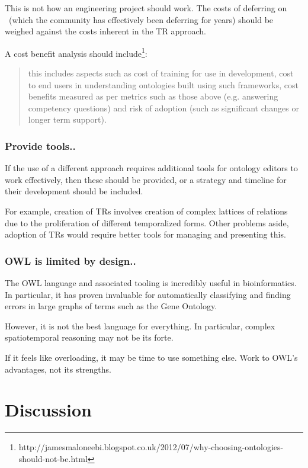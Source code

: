 \documentclass{bioinfo}
\def\P1{\pr{P-1}}
\begin{document}
This is not how an engineering project should work. The costs of
deferring on \P1\ (which the community has effectively been deferring
for years) should be weighed against the costs inherent in the TR
approach.

A cost benefit analysis should include\footnote{http://jamesmaloneebi.blogspot.co.uk/2012/07/why-choosing-ontologies-should-not-be.html}:

\begin{quotation}
this includes aspects such as cost of training for use in development,
cost to end users in understanding ontologies built using such
frameworks, cost benefits measured as per metrics such as those above
(e.g. answering competency questions) and risk of adoption (such as
significant changes or longer term support).
\end{quotation}


\subsubsection{Provide tools..} If the use of a different approach
requires additional tools for ontology editors to work effectively,
then these should be provided, or a strategy and timeline for their
development should be included.

For example, creation of TRs involves creation of complex lattices of
relations due to the proliferation of different temporalized
forms. Other problems aside, adoption of TRs would require better
tools for managing and presenting this.

\subsubsection{OWL is limited by design..} The OWL
language and associated tooling is incredibly useful in
bioinformatics. In particular, it has proven invaluable for
automatically classifying and finding errors in large graphs of terms
such as the Gene Ontology.

However, it is not the best language for everything. In particular,
complex spatiotemporal reasoning may not be its forte.

If it feels like overloading, it may be time to use something
else. Work to OWL's advantages, not its strengths.


\section{Discussion}
\end{document}
